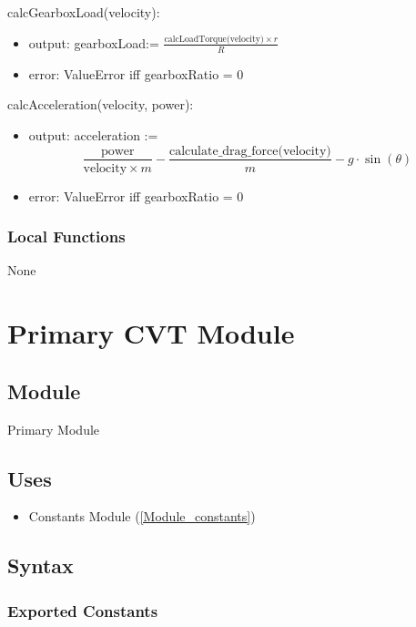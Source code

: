 \documentclass[12pt, titlepage]{article}
\begin{document}
\noindent calcGearboxLoad(velocity):
\begin{itemize}
\item output: gearboxLoad:= $\frac{\text{calcLoadTorque(velocity)} \times r}{R}$
\item error: ValueError iff gearboxRatio = 0
\end{itemize}

\noindent calcAcceleration(velocity, power):
\begin{itemize}
\item output: acceleration :=
\[
\frac{\text{power}}{\text{velocity} \times m} - \frac{\text{calculate\_drag\_force(velocity)}}{m} - g \cdot \sin(\theta)
\]
\item error: ValueError iff gearboxRatio = 0
\end{itemize}

\subsubsection{Local Functions}

None

\newpage

\section{Primary CVT Module} \label{Primary_CVT_Module} 
\subsection{Module}

Primary Module

\subsection{Uses}

\begin{itemize}
  \item Constants Module (\ref{Module_constants})
\end{itemize}

\subsection{Syntax}

\subsubsection{Exported Constants}
\end{document}

